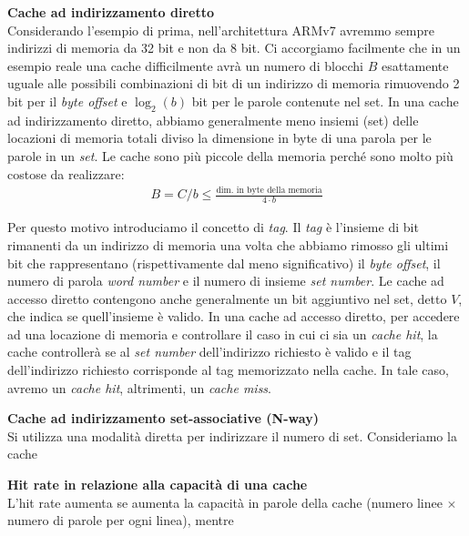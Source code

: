 \begin{defn}
    \textbf{Cache ad indirizzamento diretto} \\
    Considerando l'esempio di prima, nell'architettura ARMv7 avremmo sempre
    indirizzi di memoria da 32 bit e non da 8 bit. Ci accorgiamo facilmente che
    in un esempio reale una cache difficilmente avrà un numero di blocchi $B$
    esattamente uguale alle possibili combinazioni di bit di un indirizzo di
    memoria rimuovendo 2 bit per il \textit{byte offset} e $\log_2(b)$ bit per
    le parole contenute nel set. In una cache ad indirizzamento diretto, abbiamo
    generalmente meno insiemi (set) delle locazioni di memoria totali diviso la
    dimensione in byte di una parola per le parole in un \textit{set}. Le cache
    sono più piccole della memoria perché sono molto più costose da realizzare:
    \begin{equation*}
        \begin{aligned}
            B = C/b \leq \frac{\text{dim. in byte della memoria}}{4 \cdot b}
        \end{aligned}
    \end{equation*}

    Per questo motivo introduciamo il concetto di \textit{tag}. Il \textit{tag}
    è l'insieme di bit rimanenti da un indirizzo di memoria una volta che
    abbiamo rimosso gli ultimi bit che rappresentano (rispettivamente dal meno
    significativo) il \textit{byte offset}, il numero di parola \textit{word
    number} e il numero di insieme \textit{set number}. Le cache ad accesso
    diretto contengono anche generalmente un bit aggiuntivo nel set, detto $V$,
    che indica se quell'insieme è valido. In una cache ad accesso diretto, per
    accedere ad una locazione di memoria e controllare il caso in cui ci sia un
    \textit{cache hit}, la cache controllerà se al \textit{set number}
    dell'indirizzo richiesto è valido e il tag dell'indirizzo richiesto
    corrisponde al tag memorizzato nella cache. In tale caso, avremo un
    \textit{cache hit}, altrimenti, un \textit{cache miss}.
\end{defn}

\begin{defn}
    \textbf{Cache ad indirizzamento set-associative (N-way)} \\
    Si utilizza una modalità diretta per indirizzare il numero di set.
    Consideriamo la cache
\end{defn}

\begin{defn}
    \textbf{Hit rate in relazione alla capacità di una cache} \\
    L'hit rate aumenta se aumenta la capacità in parole della cache (numero
    linee $\times$ numero di parole per ogni linea), mentre
\end{defn}

